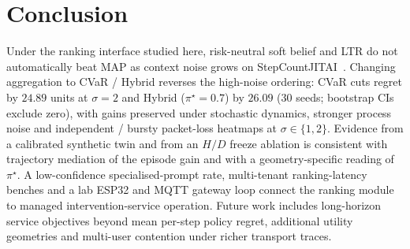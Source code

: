 \documentclass[journal]{IEEEtran}
\begin{document}
\section{Conclusion}
\label{sec:conclusion}

Under the ranking interface studied here, risk-neutral soft belief and LTR do not automatically beat MAP as context noise grows on StepCountJITAI~\cite{karine2023uai,karine2024stepcount}.
Changing aggregation to CVaR / Hybrid reverses the high-noise ordering: CVaR cuts regret by \(24.89\) units at \(\sigma=2\) and Hybrid (\(\pi^\star=0.7\)) by \(26.09\) (30 seeds; bootstrap CIs exclude zero), with gains preserved under stochastic dynamics, stronger process noise and independent / bursty packet-loss heatmaps at \(\sigma\in\{1,2\}\).
Evidence from a calibrated synthetic twin and from an \(H/D\) freeze ablation is consistent with trajectory mediation of the episode gain and with a geometry-specific reading of \(\pi^\star\).
A low-confidence specialised-prompt rate, multi-tenant ranking-latency benches and a lab ESP32 and MQTT gateway loop connect the ranking module to managed intervention-service operation.
Future work includes long-horizon service objectives beyond mean per-step policy regret, additional utility geometries and multi-user contention under richer transport traces.



\end{document}
